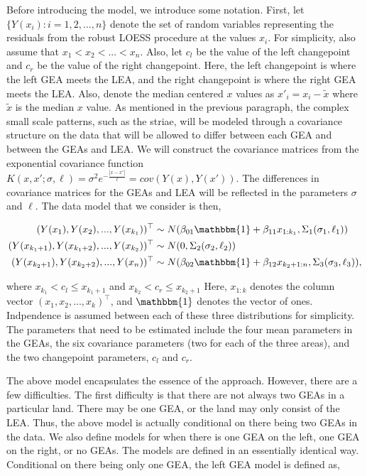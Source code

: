\documentclass[12pt]{article}
\begin{document}
Before introducing the model, we introduce some notation. First, let
\(\{Y(x_i): i = 1,2, ..., n\}\) denote the set of random variables
representing the residuals from the robust LOESS procedure at the values
\(x_i\). For simplicity, also assume that \(x_1 < x_2 < ... < x_n\).
Also, let \(c_l\) be the value of the left changepoint and \(c_r\) be
the value of the right changepoint. Here, the left changepoint is where
the left GEA meets the LEA, and the right changepoint is where the right
GEA meets the LEA. Also, denote the median centered \(x\) values as
\(x'_i = x_i - \tilde{x}\) where \(\tilde{x}\) is the median \(x\)
value. As mentioned in the previous paragraph, the complex small scale
patterns, such as the striae, will be modeled through a covariance
structure on the data that will be allowed to differ between each GEA
and between the GEAs and LEA. We will construct the covariance matrices
from the exponential covariance function
\(K(x, x';\sigma, \ell) = \sigma^2 e^{-\frac{|x - x'|}{\ell}} = cov(Y(x), Y(x'))\).
The differences in covariance matrices for the GEAs and LEA will be
reflected in the parameters \(\sigma\) and \(\ell\). The data model that
we consider is then,

\begin{align}
(Y(x_1), Y(x_2), ..., Y(x_{k_1}))^{\top} &\sim N(\beta_{01}\mathbbm{1} + \beta_{11} x_{1:k_1}, \Sigma_1(\sigma_1, \ell_1)) \\
(Y(x_{k_1 + 1}), Y(x_{k_1 + 2}), ..., Y(x_{k_2}))^{\top} &\sim N(0, \Sigma_2(\sigma_2, \ell_2)) \\ 
(Y(x_{k_2 + 1}), Y(x_{k_2 + 2}), ..., Y(x_n))^{\top} &\sim N(\beta_{02}\mathbbm{1} + \beta_{12} x_{k_2 + 1:n}, \Sigma_3(\sigma_3, \ell_3)),
\end{align}

\noindent where \(x_{k_1} < c_l \leq x_{k_1 + 1}\) and
\(x_{k_2} < c_r \leq x_{k_2 + 1}\) Here, \(x_{1:k}\) denotes the column
vector \((x_1, x_2, ..., x_k)^\top\), and \(\mathbbm{1}\) denotes the
vector of ones. Indpendence is assumed between each of these three
distributions for simplicity. The parameters that need to be estimated
include the four mean parameters in the GEAs, the six covariance
parameters (two for each of the three areas), and the two changepoint
parameters, \(c_l\) and \(c_r\).

The above model encapsulates the essence of the approach. However, there
are a few difficulties. The first difficulty is that there are not
always two GEAs in a particular land. There may be one GEA, or the land
may only consist of the LEA. Thus, the above model is actually
conditional on there being two GEAs in the data. We also define models
for when there is one GEA on the left, one GEA on the right, or no GEAs.
The models are defined in an essentially identical way. Conditional on
there being only one GEA, the left GEA model is defined as,
\end{document}
